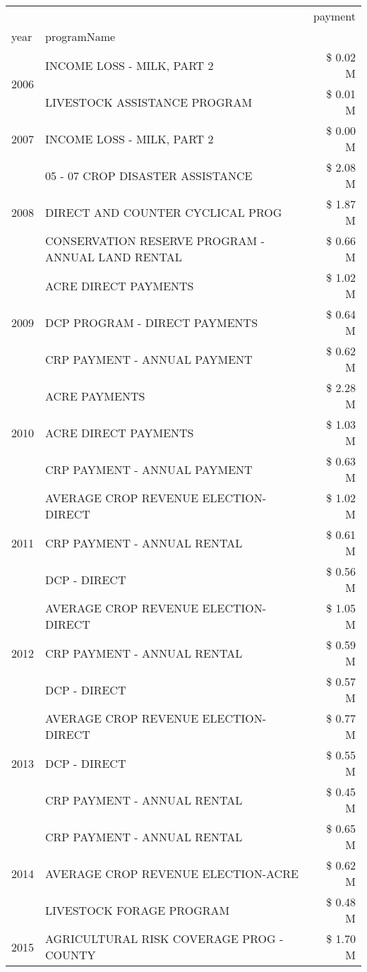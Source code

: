 \begin{tabular}{llr}
\toprule
 &  & payment \\
year & programName &  \\
\midrule
\multirow[t]{2}{*}{2006} & INCOME LOSS - MILK, PART 2 & \$ 0.02 M \\
 & LIVESTOCK ASSISTANCE PROGRAM & \$ 0.01 M \\
\cline{1-3}
2007 & INCOME LOSS - MILK, PART 2 & \$ 0.00 M \\
\cline{1-3}
\multirow[t]{3}{*}{2008} & 05 - 07 CROP DISASTER ASSISTANCE & \$ 2.08 M \\
 & DIRECT AND COUNTER CYCLICAL PROG & \$ 1.87 M \\
 & CONSERVATION RESERVE PROGRAM - ANNUAL LAND RENTAL & \$ 0.66 M \\
\cline{1-3}
\multirow[t]{3}{*}{2009} & ACRE DIRECT PAYMENTS & \$ 1.02 M \\
 & DCP PROGRAM - DIRECT PAYMENTS & \$ 0.64 M \\
 & CRP PAYMENT - ANNUAL PAYMENT & \$ 0.62 M \\
\cline{1-3}
\multirow[t]{3}{*}{2010} & ACRE PAYMENTS & \$ 2.28 M \\
 & ACRE DIRECT PAYMENTS & \$ 1.03 M \\
 & CRP PAYMENT - ANNUAL PAYMENT & \$ 0.63 M \\
\cline{1-3}
\multirow[t]{3}{*}{2011} & AVERAGE CROP REVENUE ELECTION-DIRECT & \$ 1.02 M \\
 & CRP PAYMENT - ANNUAL RENTAL & \$ 0.61 M \\
 & DCP - DIRECT & \$ 0.56 M \\
\cline{1-3}
\multirow[t]{3}{*}{2012} & AVERAGE CROP REVENUE ELECTION-DIRECT & \$ 1.05 M \\
 & CRP PAYMENT - ANNUAL RENTAL & \$ 0.59 M \\
 & DCP - DIRECT & \$ 0.57 M \\
\cline{1-3}
\multirow[t]{3}{*}{2013} & AVERAGE CROP REVENUE ELECTION-DIRECT & \$ 0.77 M \\
 & DCP - DIRECT & \$ 0.55 M \\
 & CRP PAYMENT - ANNUAL RENTAL & \$ 0.45 M \\
\cline{1-3}
\multirow[t]{3}{*}{2014} & CRP PAYMENT - ANNUAL RENTAL & \$ 0.65 M \\
 & AVERAGE CROP REVENUE ELECTION-ACRE & \$ 0.62 M \\
 & LIVESTOCK FORAGE PROGRAM & \$ 0.48 M \\
\cline{1-3}
\multirow[t]{3}{*}{2015} & AGRICULTURAL RISK COVERAGE PROG - COUNTY & \$ 1.70 M \\

\end{tabular}
